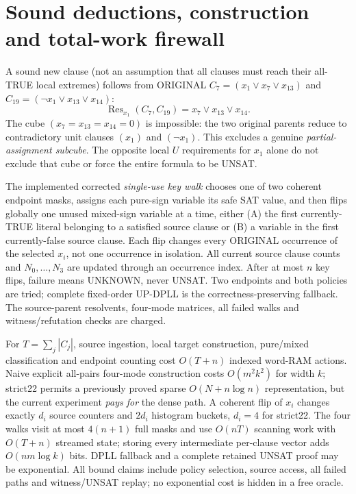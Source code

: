 \documentclass[10pt]{article}
\begin{document}
\section*{Sound deductions, construction and total-work firewall}
A sound new clause (not an assumption that all clauses must reach their all-TRUE local extremes) follows from ORIGINAL $C_7=(x_1\vee x_7\vee x_{13})$ and $C_{19}=(\neg x_1\vee x_{13}\vee x_{14})$:
\[
 \operatorname{Res}_{x_1}(C_7,C_{19})=x_7\vee x_{13}\vee x_{14}.
\]
The cube $(x_7=x_{13}=x_{14}=0)$ is impossible: the two original parents reduce to contradictory unit clauses $(x_1)$ and $(\neg x_1)$. This excludes a genuine \emph{partial-assignment subcube}. The opposite local $U$ requirements for $x_1$ alone do not exclude that cube or force the entire formula to be UNSAT.

The implemented corrected \emph{single-use key walk} chooses one of two coherent endpoint masks, assigns each pure-sign variable its safe SAT value, and then flips globally one unused mixed-sign variable at a time, either (A) the first currently-TRUE literal belonging to a satisfied source clause or (B) a variable in the first currently-false source clause. Each flip changes every ORIGINAL occurrence of the selected $x_i$, not one occurrence in isolation. All current source clause counts and $N_0,\ldots,N_3$ are updated through an occurrence index. After at most $n$ key flips, failure means UNKNOWN, never UNSAT. Two endpoints and both policies are tried; complete fixed-order UP-DPLL is the correctness-preserving fallback. The source-parent resolvents, four-mode matrices, all failed walks and witness/refutation checks are charged.

For $T=\sum_j|C_j|$, source ingestion, local target construction, pure/mixed classification and endpoint counting cost $O(T+n)$ indexed word-RAM actions. Naive explicit all-pairs four-mode construction costs $O(m^2k^2)$ for width $k$; strict22 permits a previously proved sparse $O(N+n\log n)$ representation, but the current experiment \emph{pays for} the dense path. A coherent flip of $x_i$ changes exactly $d_i$ source counters and $2d_i$ histogram buckets, $d_i=4$ for strict22. The four walks visit at most $4(n+1)$ full masks and use $O(nT)$ scanning work with $O(T+n)$ streamed state; storing every intermediate per-clause vector adds $O(nm\log k)$ bits. DPLL fallback and a complete retained UNSAT proof may be exponential. All bound claims include policy selection, source access, all failed paths and witness/UNSAT replay; no exponential cost is hidden in a free oracle.
\end{document}
